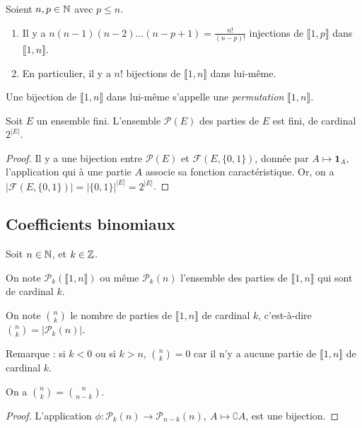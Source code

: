 \begin{proposition}\label{prop-card-injections}
Soient $n, p\in \mathbb{N}$ avec $p\leq n$.
\begin{enumerate}
\item Il y a $n(n-1)(n-2)...(n-p+1)=\frac{n!}{(n-p)!}$ injections de $\llbracket 1,p\rrbracket$ dans $\llbracket 1,n\rrbracket$.
\item En particulier, il y a $n!$ bijections de $\llbracket 1,n\rrbracket$ dans lui-même.
\end{enumerate}
\end{proposition}

Une bijection de $\llbracket 1,n\rrbracket$ dans lui-même s'appelle une \emph{permutation} $\llbracket 1,n\rrbracket$.

\begin{proposition}
\label{prop-cardinal-parties}
Soit $E$ un ensemble fini. L'ensemble $\mathcal P(E)$ des parties de $E$ est fini, de cardinal $2^{|E|}$.
\end{proposition}
\begin{proof}
Il y a une bijection entre $\mathcal P(E)$ et $\mathcal F(E,\{0,1\})$, donnée par $A\mapsto \mathbf{1}_A$, l'application qui à une partie $A$ associe sa fonction caractéristique. Or, on a $|\mathcal F(E,\{0,1\})| = |\{0,1\}|^{|E|} =2^{|E|} $.
\end{proof}

\subsection{Coefficients binomiaux}

\begin{definition}
Soit $n\in\mathbb{N}$, et $k\in \mathbb{Z}$. 

On note $\mathcal P_k(\llbracket 1,n\rrbracket)$ ou même $\mathcal P_k(n)$ l'ensemble des parties de $\llbracket 1,n\rrbracket$ qui sont de cardinal $k$.

On note $\binom{n}{k}$ le nombre de parties de $\llbracket 1,n\rrbracket$ de cardinal $k$, c'est-à-dire $\binom{n}{k}=|\mathcal P_k(n)|$.
\end{definition}

Remarque : si $k<0$ ou si $k>n$, $\binom{n}{k}=0$ car il n'y a aucune partie de $\llbracket 1,n\rrbracket$ de cardinal $k$.

\begin{proposition}
On a $\binom{n}{k} = \binom{n}{n-k}$.
\end{proposition}
\begin{proof}
L'application $\phi : \mathcal P_k(n) \to \mathcal P_{n-k}(n), \: A\mapsto  \complement A$, est une bijection.
\end{proof}

